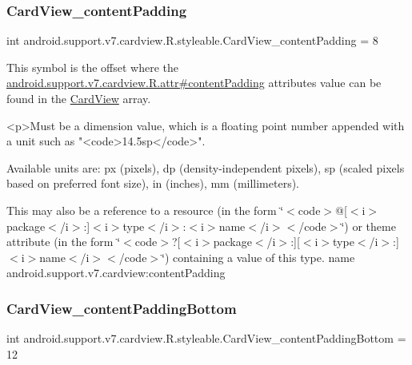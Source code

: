 \subsubsection{\texorpdfstring{Card\+View\+\_\+content\+Padding}{CardView\_contentPadding}}
{\footnotesize\ttfamily int android.\+support.\+v7.\+cardview.\+R.\+styleable.\+Card\+View\+\_\+content\+Padding = 8\hspace{0.3cm}{\ttfamily [static]}}

This symbol is the offset where the \hyperlink{classandroid_1_1support_1_1v7_1_1cardview_1_1R_1_1attr_ad472a4ef5fdf1c61bfdaa26667c40b08}{android.\+support.\+v7.\+cardview.\+R.\+attr\#content\+Padding} attribute\textquotesingle{}s value can be found in the \hyperlink{classandroid_1_1support_1_1v7_1_1cardview_1_1R_1_1styleable_ad08b98a07471f174f404c58941fc82ca}{Card\+View} array.

\begin{DoxyVerb}      <p>Must be a dimension value, which is a floating point number appended with a unit such as "<code>14.5sp</code>".
\end{DoxyVerb}
 Available units are\+: px (pixels), dp (density-\/independent pixels), sp (scaled pixels based on preferred font size), in (inches), mm (millimeters). 

This may also be a reference to a resource (in the form \char`\"{}$<$code$>$@\mbox{[}$<$i$>$package$<$/i$>$\+:\mbox{]}$<$i$>$type$<$/i$>$\+:$<$i$>$name$<$/i$>$$<$/code$>$\char`\"{}) or theme attribute (in the form \char`\"{}$<$code$>$?\mbox{[}$<$i$>$package$<$/i$>$\+:\mbox{]}\mbox{[}$<$i$>$type$<$/i$>$\+:\mbox{]}$<$i$>$name$<$/i$>$$<$/code$>$\char`\"{}) containing a value of this type.  name android.\+support.\+v7.\+cardview\+:content\+Padding \mbox{\label{classandroid_1_1support_1_1v7_1_1cardview_1_1R_1_1styleable_a04aea907d43f247611fdaa27549aa94b}} 
\subsubsection{\texorpdfstring{Card\+View\+\_\+content\+Padding\+Bottom}{CardView\_contentPaddingBottom}}
{\footnotesize\ttfamily int android.\+support.\+v7.\+cardview.\+R.\+styleable.\+Card\+View\+\_\+content\+Padding\+Bottom = 12\hspace{0.3cm}{\ttfamily [static]}}

